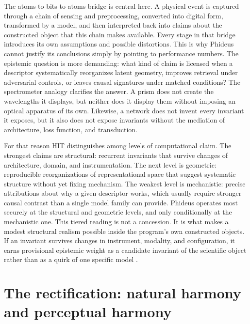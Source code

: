 The atoms-to-bits-to-atoms bridge is central here. A physical event is captured through a chain of sensing and preprocessing, converted into digital form, transformed by a model, and then interpreted back into claims about the constructed object that this chain makes available. Every stage in that bridge introduces its own assumptions and possible distortions. This is why Phideus cannot justify its conclusions simply by pointing to performance numbers. The epistemic question is more demanding: what kind of claim is licensed when a descriptor systematically reorganizes latent geometry, improves retrieval under adversarial controls, or leaves causal signatures under matched conditions? The spectrometer analogy clarifies the answer. A prism does not create the wavelengths it displays, but neither does it display them without imposing an optical apparatus of its own. Likewise, a network does not invent every invariant it exposes, but it also does not expose invariants without the mediation of architecture, loss function, and transduction.

For that reason HIT distinguishes among levels of computational claim. The strongest claims are structural: recurrent invariants that survive changes of architecture, domain, and instrumentation. The next level is geometric: reproducible reorganizations of representational space that suggest systematic structure without yet fixing mechanism. The weakest level is mechanistic: precise attributions about why a given descriptor works, which usually require stronger causal contrast than a single model family can provide. Phideus operates most securely at the structural and geometric levels, and only conditionally at the mechanistic one. This tiered reading is not a concession. It is what makes a modest structural realism possible inside the program's own constructed objects. If an invariant survives changes in instrument, modality, and configuration, it earns provisional epistemic weight as a candidate invariant of the scientific object rather than as a quirk of one specific model \parencite{lakatos_1978, pearl_2009, popper_1959, kornblith_2019}.

\section{The rectification: natural harmony and perceptual harmony}

